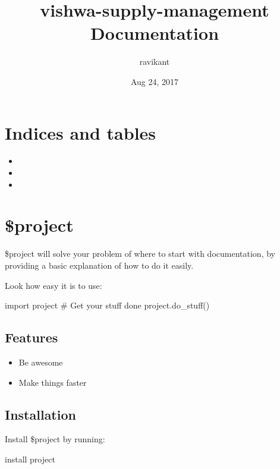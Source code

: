 \documentclass[letterpaper,10pt,english]{sphinxmanual}
\title{vishwa-supply-management Documentation}
\date{Aug 24, 2017}
\author{ravikant}
\begin{document}
\maketitle
\sphinxtableofcontents
{}\label{\detokenize{index::doc}}



\chapter{Indices and tables}
\label{\detokenize{index:indices-and-tables}}\label{\detokenize{index:welcome-to-vishwa-supply-management-s-documentation}}\begin{itemize}
\item {} 

\item {} 

\item {} 

\end{itemize}


\chapter{\$project}
\label{\detokenize{index:project}}
\$project will solve your problem of where to start with documentation,
by providing a basic explanation of how to do it easily.

Look how easy it is to use:

import project
\# Get your stuff done
project.do\_stuff()


\section{Features}
\label{\detokenize{index:features}}\begin{itemize}
\item {} 
Be awesome

\item {} 
Make things faster

\end{itemize}


\section{Installation}
\label{\detokenize{index:installation}}
Install \$project by running:

install project
\end{document}
